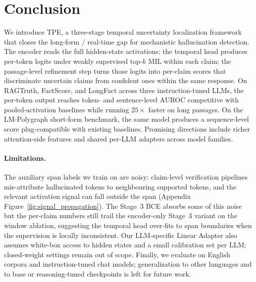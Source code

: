 \section{Conclusion}

We introduce TPE, a three-stage temporal uncertainty localization
framework that closes the long-form / real-time gap for mechanistic
hallucination detection. The encoder reads the full hidden-state
activations; the temporal head produces per-token logits under weakly
supervised top-$k$ MIL within each claim; the passage-level
refinement step turns those logits into per-claim scores that
discriminate uncertain claims from confident ones within the same
response. On RAGTruth, FactScore, and LongFact across three
instruction-tuned LLMs, the per-token output reaches token- and
sentence-level AUROC competitive with pooled-activation baselines while
running $25\times$ faster on long passages. On the
LM-Polygraph short-form benchmark, the same model produces a
sequence-level score plug-compatible with existing baselines. Promising
directions include richer attention-side features and shared per-LLM
adapters across model families.

\paragraph{Limitations.} The auxiliary span labels we train on are
noisy: claim-level verification pipelines mis-attribute hallucinated tokens to
neighbouring supported tokens, and the relevant activation signal can
fall outside the span (Appendix Figure~\ref{fig:signal_propagation}). The
Stage~3 BCE absorbs some of this noise but the per-claim numbers
still trail the encoder-only Stage~3 variant on the window ablation,
suggesting the temporal head over-fits to span boundaries when the
supervision is locally inconsistent. Our LLM-specific Linear Adapter
also assumes white-box access to hidden states and a small calibration
set per LLM; closed-weight settings remain out of scope. Finally, we
evaluate on English corpora and instruction-tuned chat models;
generalization to other languages and to base or reasoning-tuned
checkpoints is left for future work.
